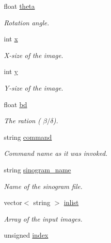 \begin{DoxyCompactItemize}
float \hyperlink{structclargs_a41a3be7cfbde077785e05d906ce893ad}{theta}
\begin{DoxyCompactList}\small\item\em Rotation angle. \item\end{DoxyCompactList}\item 
int \hyperlink{structclargs_a67d1e09c6d040b61e30e2813c84c378a}{x}
\begin{DoxyCompactList}\small\item\em X-\/size of the image. \item\end{DoxyCompactList}\item 
int \hyperlink{structclargs_a004af862a0d20dacb1088b9d6e2d1d61}{y}
\begin{DoxyCompactList}\small\item\em Y-\/size of the image. \item\end{DoxyCompactList}\item 
float \hyperlink{structclargs_a5f8c41d1199e9bca822a47bc18759648}{bd}
\begin{DoxyCompactList}\small\item\em The ration ( $\beta/\delta$). \item\end{DoxyCompactList}\item 
string \hyperlink{structclargs_a8aa339bd9296e4de3e77342c84571b21}{command}
\begin{DoxyCompactList}\small\item\em Command name as it was invoked. \item\end{DoxyCompactList}\item 
string \hyperlink{structclargs_a2a13987ab1b5f2522e22dd75bd3b5b04}{sinogram\_\-name}
\begin{DoxyCompactList}\small\item\em Name of the sinogram file. \item\end{DoxyCompactList}\item 
vector$<$ string $>$ \hyperlink{structclargs_a193c55eaced81862707a733b800295c5}{inlist}
\begin{DoxyCompactList}\small\item\em Array of the input images. \item\end{DoxyCompactList}\item 
unsigned \hyperlink{structclargs_acc40456fdf94c62c400a8a963261a6b3}{index}

\end{DoxyCompactItemize}
